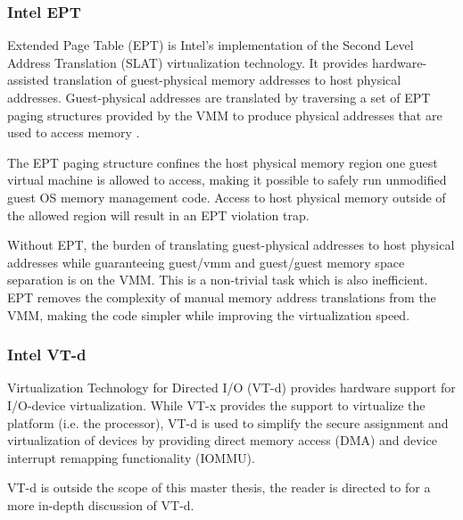 \subsubsection{Intel EPT}
Extended Page Table (EPT) is Intel's implementation of the Second
Level Address Translation (SLAT) virtualization technology. It
provides hardware-assisted translation of guest-physical memory addresses to
host physical addresses. Guest-physical addresses are translated by traversing a
set of EPT paging structures provided by the VMM to produce physical addresses
that are used to access memory \cite{IntelSDM}.

The EPT paging structure confines the host physical memory region one guest
virtual machine is allowed to access, making it possible to safely run
unmodified guest OS memory management code. Access to host physical memory
outside of the allowed region will result in an EPT violation trap.

Without EPT, the burden of translating guest-physical addresses to host physical
addresses while guaranteeing guest/vmm and guest/guest memory space separation
is on the VMM. This is a non-trivial task which is also inefficient. EPT removes
the complexity of manual memory address translations from the VMM, making the
code simpler while improving the virtualization speed.

\subsubsection{Intel VT-d}
Virtualization Technology for Directed I/O (VT-d) provides hardware
support for I/O-device virtualization. While VT-x provides the support to
virtualize the platform (i.e. the processor), VT-d is used to simplify the
secure assignment and virtualization of devices by providing direct memory
access (DMA) and device interrupt remapping functionality
(IOMMU).

VT-d is outside the scope of this master thesis, the reader is directed to
\cite{IntelVTd} for a more in-depth discussion of VT-d.
